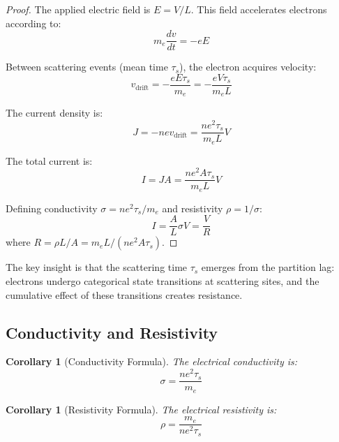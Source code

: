 \documentclass[twocolumn,showpacs,preprintnumbers,amsmath,amssymb,prd]{revtex4-2}
\newtheorem{corollary}[theorem]{Corollary}
\newcommand{\taus}{\tau_s}
\begin{document}
\begin{proof}
The applied electric field is $E = V/L$. This field accelerates electrons according to:
\begin{equation}
m_e \frac{dv}{dt} = -eE
\label{eq:acceleration}
\end{equation}

Between scattering events (mean time $\taus$), the electron acquires velocity:
\begin{equation}
v_{\text{drift}} = -\frac{eE\taus}{m_e} = -\frac{eV\taus}{m_e L}
\label{eq:drift_velocity}
\end{equation}

The current density is:
\begin{equation}
J = -nev_{\text{drift}} = \frac{ne^2 \taus}{m_e L} V
\label{eq:current_density}
\end{equation}

The total current is:
\begin{equation}
I = JA = \frac{ne^2 A \taus}{m_e L} V
\label{eq:current}
\end{equation}

Defining conductivity $\sigma = ne^2\taus/m_e$ and resistivity $\rho = 1/\sigma$:
\begin{equation}
I = \frac{A}{L} \sigma V = \frac{V}{R}
\end{equation}
where $R = \rho L/A = m_e L/(ne^2 A\taus)$.
\end{proof}

The key insight is that the scattering time $\taus$ emerges from the partition lag: electrons undergo categorical state transitions at scattering sites, and the cumulative effect of these transitions creates resistance.

\subsection{Conductivity and Resistivity}

\begin{corollary}[Conductivity Formula]
\label{cor:conductivity}
The electrical conductivity is:
\begin{equation}
\sigma = \frac{ne^2\taus}{m_e}
\label{eq:conductivity}
\end{equation}
\end{corollary}

\begin{corollary}[Resistivity Formula]
\label{cor:resistivity}
The electrical resistivity is:
\begin{equation}
\rho = \frac{m_e}{ne^2\taus}
\label{eq:resistivity}
\end{equation}
\end{corollary}
\end{document}
